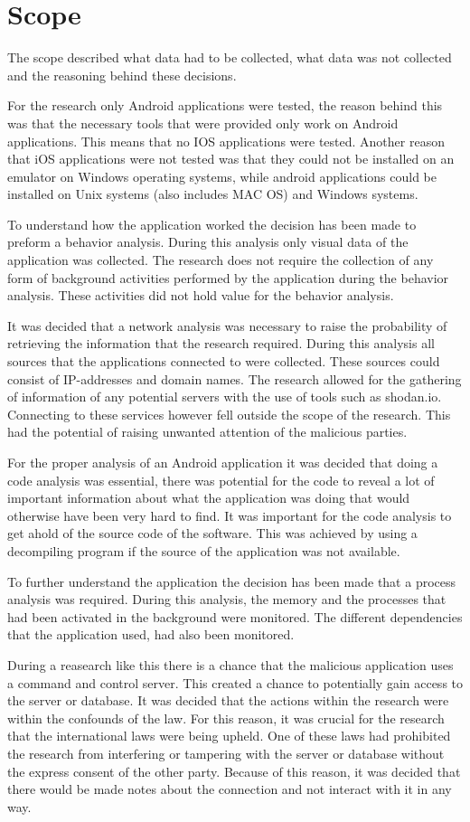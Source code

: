 \section{Scope}

The scope described what data had to be collected, what data was not collected and the reasoning behind these decisions.

For the research only Android applications were tested, the reason behind this was that the necessary tools that were provided only work on Android applications. 
This means that no IOS applications were tested. 
Another reason that iOS applications were not tested was that they could not be installed on an emulator on Windows operating systems, 
while android applications could be installed on Unix systems (also includes MAC OS) and Windows systems.

To understand how the application worked the decision has been made to preform a behavior analysis. 
During this analysis only visual data of the application was collected. 
The research does not require the collection of any form of background activities performed by the application during the behavior analysis. 
These activities did not hold value for the behavior analysis.

It was decided that a network analysis was necessary to raise the probability of retrieving the information that the research required. 
During this analysis all sources that the applications connected to were collected. These sources could consist of IP-addresses and domain names. 
The research allowed for the gathering of information of any potential servers with the use of tools such as shodan.io. 
Connecting to these services however fell outside the scope of the research. This had the potential of raising unwanted attention of the malicious parties.

For the proper analysis of an Android application it was decided that doing a code analysis was essential, 
there was potential for the code to reveal a lot of important information about what the application was doing that would otherwise have been very hard to find. 
It was important for the code analysis to get ahold of the source code of the software. 
This was achieved by using a decompiling program if the source of the application was not available.

To further understand the application the decision has been made that a process analysis was required. 
During this analysis, the memory and the processes that had been activated in the background were monitored. 
The different dependencies that the application used, had also been monitored.

During a reasearch like this there is a chance that the malicious application uses a command and control server. 
This created a chance to potentially gain access to the server or database. It was decided that the actions within the research were within the confounds of the law. 
For this reason, it was crucial for the research that the international laws were being upheld. 
One of these laws had prohibited the research from interfering or tampering with the server or database without the express consent of the other party. 
Because of this reason, it was decided that there would be made notes about the connection and not interact with it in any way.